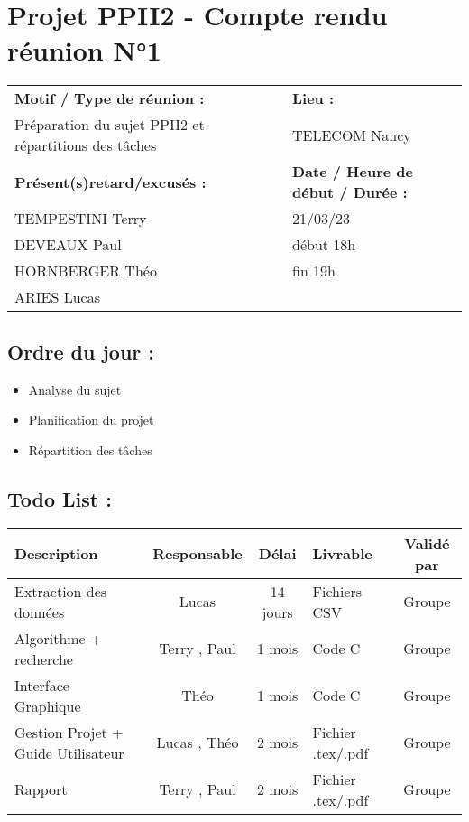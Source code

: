 \documentclass{article}
\begin{document}
\section*{Projet PPII2 - Compte rendu réunion N°1}
\begin{tabular}{|p{7cm}|p{6cm}|}
    \hline
    \textbf{Motif / Type de réunion :}
    & \textbf{Lieu :}
    \\
    Préparation du sujet PPII2 et répartitions des tâches
    &
    TELECOM Nancy
    \\ \hline
    \textbf{Présent(s)retard/excusés :}
    &
    \textbf{Date / Heure de début / Durée :}
    \\
    TEMPESTINI Terry &  21/03/23\\
    DEVEAUX Paul & début 18h\\
    HORNBERGER Théo & fin 19h\\
    ARIES Lucas &
    \\ \hline
\end{tabular}

\subsection*{Ordre du jour :}
\begin{itemize}
    \item{Analyse du sujet}
    \item{Planification du projet}
    \item{Répartition des tâches}
\end{itemize}

\subsection*{Todo List :}
\begin{tabular}{|p{3.5cm}|c|c|p{4.5cm}|c|}
    \hline
    Description & Responsable & Délai & Livrable & Validé par
    \\ \hline
    Extraction des données & Lucas  & 14 jours & Fichiers CSV & Groupe\\
    Algorithme + recherche & Terry , Paul  & 1 mois & Code C & Groupe\\
    Interface Graphique & Théo  & 1 mois & Code C & Groupe\\
    Gestion Projet + Guide Utilisateur & Lucas , Théo  & 2 mois & Fichier .tex/.pdf & Groupe\\
    Rapport & Terry , Paul  & 2 mois & Fichier .tex/.pdf & Groupe
    \\ \hline
\end{tabular}
\end{document}
